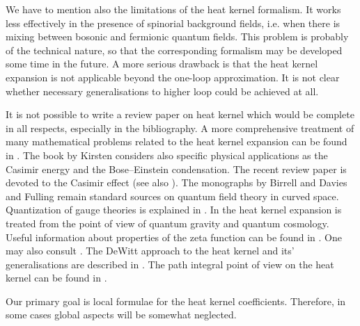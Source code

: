 We have to mention also the limitations of the heat kernel
formalism. It works less effectively in the presence of spinorial
background fields, i.e. when there is mixing between bosonic
and fermionic quantum fields. This problem is probably of the
technical nature, so that the corresponding formalism may be
developed some time in the future. A more serious drawback is
that the heat kernel expansion is not applicable beyond the
one-loop approximation. It is not clear whether necessary
generalisations to higher loop could be achieved at all.  

It is not possible to write a review paper on heat kernel which
would be complete in all respects, especially in the bibliography.
A more comprehensive treatment of many mathematical problems related
to the heat kernel expansion can be found in 
\cite{Gilkey:1995,Kirsten:2001wz}. The book by Kirsten \cite{Kirsten:2001wz}
considers also specific physical applications as the Casimir energy and
the Bose--Einstein condensation. The recent review paper 
\cite{Bordag:2001qi} is devoted to the Casimir effect
(see also \cite{Milton:2001yy}). The monographs
by Birrell and Davies \cite{Birrell:1982ix} and Fulling 
\cite{Fulling:1989nb} remain standard sources on quantum field theory
in curved space. Quantization of gauge theories is explained in
\cite{Faddeev:1980be}. 
In  \cite{Buchbinder:1992rb,Esposito:1997wt,Esposito:1997mw,
Avramidi:2000bm,Esposito:2001rx}
the heat kernel expansion is treated from the point of view of quantum
gravity and quantum cosmology. Useful information about properties of
the zeta function can be found in \cite{Elizalde:1995zk}.
One may also consult \cite{EORBZ}. The DeWitt approach to the heat kernel
and its' generalisations are described in \cite{Barvinsky:1985an}.
The path integral point of view on the heat kernel can be found
in \cite{Roepstorff:1994ga}.

Our primary goal is local formulae for the heat kernel coefficients.
Therefore, in some cases global aspects will be somewhat neglected.

